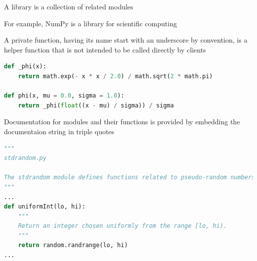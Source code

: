 \documentclass[8pt,a4paper,compress]{beamer}
\begin{document}
\begin{frame}[fragile]
\pause

A library is a collection of related modules

\pause
\bigskip

For example, NumPy is a library for scientific computing

\pause
\bigskip

A private function, having its name start with an underscore by convention, is a helper function that is not intended to be called directly by clients
\begin{lstlisting}[language=Python]
def _phi(x):
    return math.exp(- x * x / 2.0) / math.sqrt(2 * math.pi)
    
def phi(x, mu = 0.0, sigma = 1.0):
    return _phi(float((x - mu) / sigma)) / sigma
\end{lstlisting}

\pause
\bigskip

Documentation for modules and their functions is provided by embedding the documentaion string in triple quotes
\begin{lstlisting}[language=Python]
"""
stdrandom.py

The stdrandom module defines functions related to pseudo-random numbers.
"""
...
def uniformInt(lo, hi):
    """
    Return an integer chosen uniformly from the range [lo, hi).
    """
    return random.randrange(lo, hi)
...
\end{lstlisting}
\end{frame}
\end{document}
